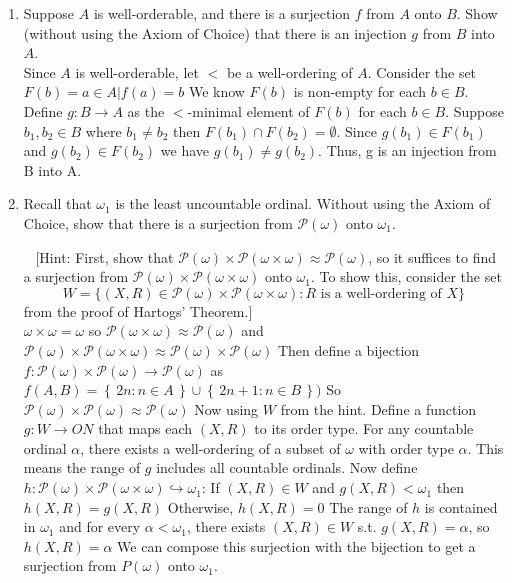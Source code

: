 \documentclass[11pt]{amsart}
\newcommand{\set}[1]{\left\{\,#1\,\right\}}
\begin{document}
\begin{enumerate}
\newpage

\item  Suppose $A$ is well-orderable, and there is a surjection $f$ from $A$ onto $B$. Show (without using the Axiom of Choice) that there is an injection $g$ from $B$ into $A$.
\\ Since $A$ is well-orderable, let $<$ be a well-ordering of $A$.
Consider the set $F(b) = {a \in A | f(a) = b}$
We know $F(b)$ is non-empty for each $b \in B$.
Define $g: B \rightarrow A$ as the $<$-minimal element of $F(b)$ for each $b \in B$.
Suppose $b_1, b_2 \in B$ where $b_1 \neq b_2$ then $F(b_1) \cap F(b_2) = \emptyset$.
Since $g(b_1) \in F(b_1)$ and $g(b_2) \in F(b_2)$ we have $g(b_1) \neq g(b_2)$.
Thus, g is an injection from B into A.



\newpage

\item Recall that $\omega_1$ is the least uncountable ordinal. Without using the Axiom of Choice, show that there is a surjection from $\mathcal{P}(\omega)$ onto $\omega_1$.

\ 
\newcommand{\PP}{\mathcal{P}}
\noindent
{\small [Hint: First, show that $\mathcal{P}(\omega) \times \mathcal{P}(\omega \times \omega) \approx \mathcal{P}(\omega)$, so it suffices to find a surjection from $\mathcal{P}(\omega) \times \mathcal{P}(\omega \times \omega)$ onto $\omega_1$. To show this, consider the set
\[ W= \{ (X,R) \in \mathcal{P}(\omega) \times \mathcal{P}(\omega \times \omega) : \text{$R$ is a well-ordering of $X$} \} \]
from the proof of Hartogs' Theorem.] }
\\
$\omega \times \omega = \omega$ so $\PP(\omega \times \omega ) \approx \PP(\omega)$
and $\PP(\omega) \times \PP(\omega \times \omega ) \approx \PP(\omega) \times \PP(\omega)$
Then define a bijection $f: \PP(\omega) \times \PP(\omega) \rightarrow \PP(\omega)$ as $f(A,B) = \set{2n : n\in A} \cup \set{2n+1 : n \in B})$
So $\PP(\omega) \times \PP(\omega) \approx \PP(\omega)$
Now using $W$ from the hint.
Define a function $g: W \rightarrow ON$ that maps each $(X,R)$ to its order type.
For any countable ordinal $\alpha$, there exists a well-ordering of a subset of $\omega$ with order type $\alpha$.
This means the range of $g$ includes all countable ordinals.
Now define $h: \PP(\omega) \times \PP(\omega \times \omega) \hookrightarrow \omega_1$:
If $(X,R) \in W$ and $g(X,R) < \omega_1$  then $h(X,R) = g(X,R)$
Otherwise, $h(X,R) = 0$
The range of $h$ is contained in $\omega_1$ and for every  $\alpha < \omega_1$, there exists $(X,R) \in W$ s.t. $g(X,R) = \alpha$, so $h(X,R) = \alpha$
We can compose this surjection with the bijection to get a surjection from $P(\omega)$ onto $\omega_1$.

\end{enumerate}
\end{document}
